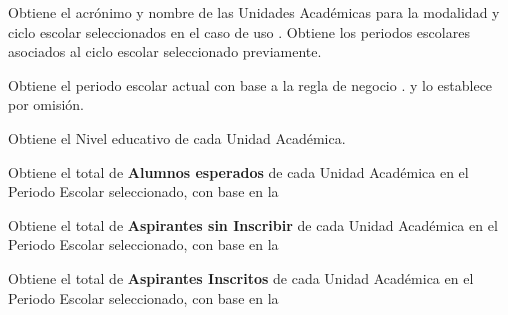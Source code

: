 \begin{UCtrayectoria}
    \UCpaso Obtiene el acrónimo y nombre de las Unidades Académicas para la modalidad y ciclo escolar seleccionados en el caso de uso . 
    \UCpaso Obtiene los periodos escolares asociados al ciclo escolar seleccionado previamente.
    
    
    \UCpaso Obtiene el periodo escolar actual con base a la regla de negocio .  y lo establece por omisión.
    
    
   
    
    \UCpaso \label{IN-DAE-CU6:ges} Obtiene el Nivel educativo de cada Unidad Académica.       
    
    
    
   
    
     \UCpaso \label{IN-DAE-CU6:cambio} Obtiene el total de \textbf{Alumnos esperados} de cada Unidad Académica en el Periodo Escolar seleccionado, con base en la 
     
     \UCpaso Obtiene el total de \textbf{Aspirantes sin Inscribir} de cada Unidad Académica en el Periodo Escolar seleccionado, con base en la 
     
      \UCpaso Obtiene el total de \textbf{Aspirantes Inscritos} de cada Unidad Académica en el Periodo Escolar seleccionado, con base en la 
      

\end{UCtrayectoria}
